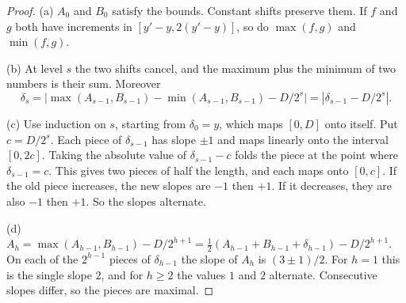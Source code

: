 \begin{proof}
(a) $A_0$ and $B_0$ satisfy the bounds. Constant shifts preserve them. If $f$ and $g$ both have increments
in $[y'-y,2(y'-y)]$, so do $\max(f,g)$ and $\min(f,g)$.

(b) At level $s$ the two shifts cancel, and the maximum plus the minimum of two numbers is their sum.
Moreover
\[
 \delta_s=\bigl|\max(A_{s-1},B_{s-1})-\min(A_{s-1},B_{s-1})-D/2^s\bigr|=|\delta_{s-1}-D/2^s| .
\]

(c) Use induction on $s$, starting from $\delta_0=y$, which maps $[0,D]$ onto itself. Put $c=D/2^s$. Each
piece of $\delta_{s-1}$ has slope $\pm1$ and maps linearly onto the interval $[0,2c]$. Taking the absolute
value of $\delta_{s-1}-c$ folds the piece at the point where $\delta_{s-1}=c$. This gives two pieces of
half the length, and each maps onto $[0,c]$. If the old piece increases, the new slopes are $-1$ then
$+1$. If it decreases, they are also $-1$ then $+1$. So the slopes alternate.

(d) $A_h=\max(A_{h-1},B_{h-1})-D/2^{h+1}=\tfrac12(A_{h-1}+B_{h-1}+\delta_{h-1})-D/2^{h+1}$. On each of the
$2^{h-1}$ pieces of $\delta_{h-1}$ the slope of $A_h$ is $(3\pm1)/2$. For $h=1$ this is the single slope
$2$, and for $h\ge2$ the values $1$ and $2$ alternate. Consecutive slopes differ, so the pieces are
maximal.
\end{proof}

